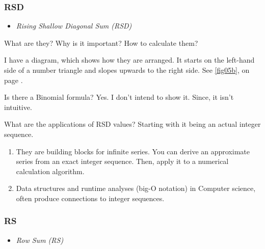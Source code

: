 \documentclass[12pt]{article}
\begin{document}
        \newpage
    
        \subsubsection{RSD}
        \label{secb:10}
               
        \begin{itemize}
            \item \textit{Rising Shallow Diagonal Sum (RSD)}
        \end{itemize}
        
        What are they? Why is it important? How to calculate them?
        
        I have a diagram, which shows how they are arranged. It starts on the left-hand side of a 
        number triangle and slopes upwards to the right side. See \cref{fig05b},  
        on page \pageref{fig05b}.
        
        Is there a Binomial formula? Yes. I don't intend to show it. Since, it isn't intuitive.
        
        
        What are the applications of RSD values? Starting with it being an actual integer 
        sequence.
        
        \begin{enumerate}
            \item They are building blocks for infinite series. You can derive an approximate 
            series from an exact integer sequence. Then, apply it to a numerical calculation 
            algorithm.
            
            \item Data structures and runtime analyses (big-O notation) in Computer science, 
            often produce connections to integer sequences.
        \end{enumerate}
        
        \subsubsection{RS}
        \label{secb:10b}
        
        \begin{itemize}
             \item \textit{Row Sum (RS)}
        \end{itemize}
         
\end{document}
